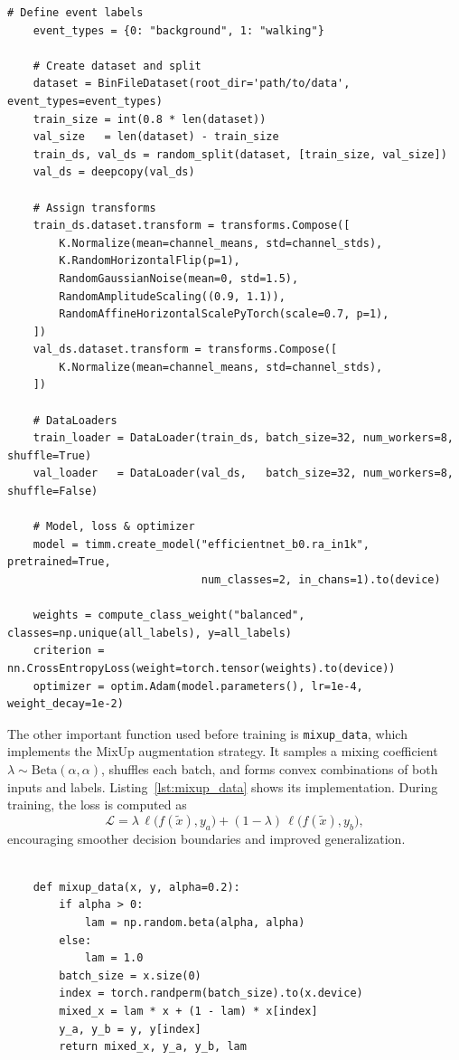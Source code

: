 \begin{lstlisting}[style=pythonstyle, caption={Dataset setup and model initialization }, label=lst:training_setup]
    # Define event labels
    event_types = {0: "background", 1: "walking"}
    
    # Create dataset and split
    dataset = BinFileDataset(root_dir='path/to/data', event_types=event_types)
    train_size = int(0.8 * len(dataset))
    val_size   = len(dataset) - train_size
    train_ds, val_ds = random_split(dataset, [train_size, val_size])
    val_ds = deepcopy(val_ds)
    
    # Assign transforms
    train_ds.dataset.transform = transforms.Compose([
        K.Normalize(mean=channel_means, std=channel_stds),
        K.RandomHorizontalFlip(p=1),
        RandomGaussianNoise(mean=0, std=1.5),
        RandomAmplitudeScaling((0.9, 1.1)),
        RandomAffineHorizontalScalePyTorch(scale=0.7, p=1),
    ])
    val_ds.dataset.transform = transforms.Compose([
        K.Normalize(mean=channel_means, std=channel_stds),
    ])
    
    # DataLoaders
    train_loader = DataLoader(train_ds, batch_size=32, num_workers=8, shuffle=True)
    val_loader   = DataLoader(val_ds,   batch_size=32, num_workers=8, shuffle=False)
    
    # Model, loss & optimizer
    model = timm.create_model("efficientnet_b0.ra_in1k", pretrained=True,
                              num_classes=2, in_chans=1).to(device)
    
    weights = compute_class_weight("balanced", classes=np.unique(all_labels), y=all_labels)
    criterion = nn.CrossEntropyLoss(weight=torch.tensor(weights).to(device))
    optimizer = optim.Adam(model.parameters(), lr=1e-4, weight_decay=1e-2)
    \end{lstlisting}

The other important function used before training is \texttt{mixup\_data}, which implements the MixUp augmentation strategy. It samples a mixing coefficient $\lambda \sim \mathrm{Beta}(\alpha,\alpha)$, shuffles each batch, and forms convex combinations of both inputs and labels. Listing~\ref{lst:mixup_data} shows its implementation. During training, the loss is computed as  
\[
\mathcal{L}
= \lambda\,\ell\bigl(f(\widetilde x),y_a\bigr)
+ (1-\lambda)\,\ell\bigl(f(\widetilde x),y_b\bigr),
\]
encouraging smoother decision boundaries and improved generalization.
\begin{lstlisting}[style=pythonstyle, caption={MixUp data augmentation function}, label=lst:mixup_data]

    def mixup_data(x, y, alpha=0.2):
        if alpha > 0:
            lam = np.random.beta(alpha, alpha)
        else:
            lam = 1.0
        batch_size = x.size(0)
        index = torch.randperm(batch_size).to(x.device)
        mixed_x = lam * x + (1 - lam) * x[index]
        y_a, y_b = y, y[index]
        return mixed_x, y_a, y_b, lam
    \end{lstlisting}


